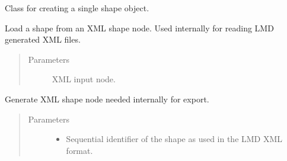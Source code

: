 \documentclass[a4paper,10pt,english,openany,oneside]{sphinxmanual}
\begin{document}
\begin{fulllineitems}
\label{\detokenize{pages/modules:lmd.lib.Shape}}
\sphinxAtStartPar
Class for creating a single shape object.

\begin{fulllineitems}
\label{\detokenize{pages/modules:lmd.lib.Shape.from_xml}}
\sphinxAtStartPar
Load a shape from an XML shape node. Used internally for reading LMD generated XML files.
\begin{quote}\begin{description}
\item[{Parameters}] \leavevmode
\sphinxAtStartPar
{} \textendash{} XML input node.

\end{description}\end{quote}

\end{fulllineitems}


\begin{fulllineitems}
\label{\detokenize{pages/modules:lmd.lib.Shape.to_xml}}
\sphinxAtStartPar
Generate XML shape node needed internally for export.
\begin{quote}\begin{description}
\item[{Parameters}] \leavevmode\begin{itemize}
\item {} 
\sphinxAtStartPar
{} \textendash{} Sequential identifier of the shape as used in the LMD XML format.


\end{itemize}
\end{description}
\end{quote}
\end{fulllineitems}
\end{fulllineitems}
\end{document}
